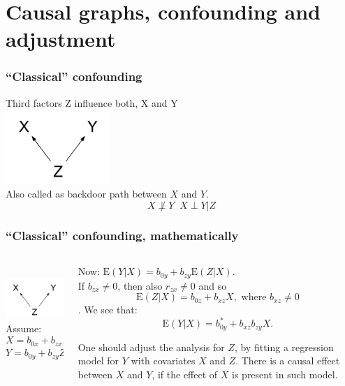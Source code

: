 \documentclass[10pt,dvipsnames,t,handout%
,aspectratio=169%
]{beamer}%
\newcommand{\E}{\mathrm{E}}
\begin{document}
\section{Causal graphs, confounding and adjustment}


\begin{frame}
	\frametitle{``Classical'' confounding}
	Third factors  Z influence both, X and Y \\
	\includegraphics[width=4cm]{conf1}\\
	Also called as \alert{backdoor path} between $X$ and $Y$. \\
	
$$X \not\perp Y \; \;  X \perp Y|Z$$
	
\end{frame}

\begin{frame}
	\frametitle{``Classical'' confounding, mathematically}
\begin{columns}
\begin{column}{5cm}
\mbox{ } \\
	\includegraphics[width=4cm]{conf1}
	\mbox{}\\[0.5cm]
Assume:
$$X= b_{0x} + b_{zx}Z + \varepsilon_x, \ \E(\varepsilon_x|Z)=0 $$  
$$ Y= b_{0y} + b_{zy}Z + \varepsilon_y, \ \E(\varepsilon_y|Z, X)=0. $$
\end{column}
\begin{column}{7cm}
Now: 
$\E(Y|X) = b_{0y} + b_{zy}\E(Z|X). $ \\[0.2cm]
If  $b_{zx} \ne 0$, then also  $r_{zx} \ne 0$ and so 
$$ \E(Z|X) =  b_{0z}+ b_{xz}X, \mbox{ where }b_{xz} \ne 0$$. 
We see that:
$$\E(Y|X) = b_{0y}^* + b_{xz}b_{zy}X. $$

\begin{block}{}\alert{One should adjust the analysis for $Z$, by fitting a regression model for $Y$ with covariates
	$X$  and $Z$.} 
There is a causal effect between $X$ and $Y$, if the effect of $X$ is present in such model. \end{block}
\end{column}
\end{columns}
\end{frame}
\end{document}

